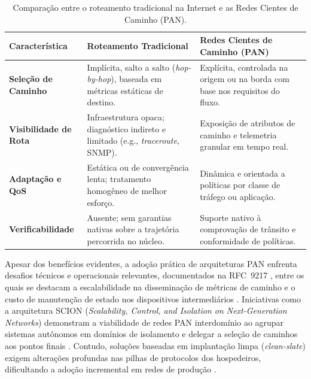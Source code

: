 \begin{table}[!htb]
    \centering
    \caption{Comparação entre o roteamento tradicional na Internet e as Redes Cientes de Caminho (PAN).}
    \label{tab:comparacao_pan}
    \begin{tabular}{p{3.2cm} p{5.3cm} p{5.5cm}}
        \hline
        \textbf{Característica} & \textbf{Roteamento Tradicional} & \textbf{Redes Cientes de Caminho (PAN)} \\
        \hline
        \textbf{Seleção de Caminho} & Implícita, salto a salto (\textit{hop-by-hop}), baseada em métricas estáticas de destino. & Explícita, controlada na origem ou na borda com base nos requisitos do fluxo. \\
        \textbf{Visibilidade de Rota} & Infraestrutura opaca; diagnóstico indireto e limitado (e.g., \textit{traceroute}, SNMP). & Exposição de atributos de caminho e telemetria granular em tempo real. \\
        \textbf{Adaptação e QoS} & Estática ou de convergência lenta; tratamento homogêneo de melhor esforço. & Dinâmica e orientada a políticas por classe de tráfego ou aplicação. \\
        \textbf{Verificabilidade} & Ausente; sem garantias nativas sobre a trajetória percorrida no núcleo. & Suporte nativo à comprovação de trânsito e conformidade de políticas. \\
        \hline
    \end{tabular}
\end{table}

Apesar dos benefícios evidentes, a adoção prática de arquiteturas PAN enfrenta desafios técnicos e operacionais relevantes, documentados na RFC~9217 \cite{trammell2022rfc}, entre os quais se destacam a escalabilidade na disseminação de métricas de caminho e o custo de manutenção de estado nos dispositivos intermediários \cite{trammell2022rfc, wei2026panqosr}. Iniciativas como a arquitetura SCION (\textit{Scalability, Control, and Isolation on Next-Generation Networks}) demonstram a viabilidade de redes PAN interdomínio ao agrupar sistemas autônomos em domínios de isolamento e delegar a seleção de caminhos aos pontos finais \cite{barrera2017scion}. Contudo, soluções baseadas em implantação limpa (\textit{clean-slate}) exigem alterações profundas nas pilhas de protocolos dos hospedeiros, dificultando a adoção incremental em redes de produção \cite{wei2026panqosr}.

